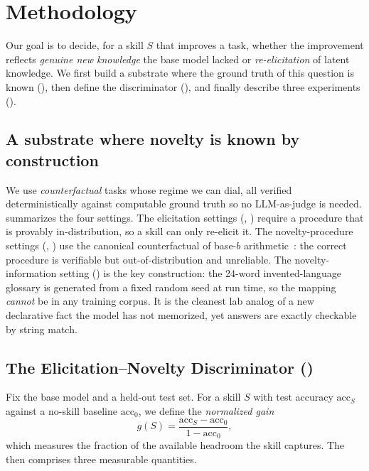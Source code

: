 \section{Methodology}
\label{sec:method}

Our goal is to decide, for a skill $S$ that improves a task, whether the improvement reflects
\emph{genuine new knowledge} the base model lacked or \emph{re-elicitation} of latent knowledge.
We first build a substrate where the ground truth of this question is known
(), then define the discriminator (), and finally
describe three experiments ().

\subsection{A substrate where novelty is known by construction}
\label{sec:substrate}

We use \emph{counterfactual} tasks whose regime we can dial, all verified deterministically
against computable ground truth so no LLM-as-judge is needed. 
summarizes the four settings. The elicitation settings (\arithbten, \vocabes) require a
procedure that is provably in-distribution, so a skill can only re-elicit it. The
novelty-procedure settings (\arithbnine, \arithbeleven) use the canonical counterfactual of
base-$b$ arithmetic~\citep{reasoningreciting}: the correct procedure is verifiable but
out-of-distribution and unreliable. The novelty-information setting (\vocabzeth) is the key
construction: the 24-word invented-language glossary is generated from a fixed random seed at
run time, so the mapping \emph{cannot} be in any training corpus. It is the cleanest lab analog
of a new declarative fact the model has not memorized, yet answers are exactly checkable by
string match.



\subsection{The Elicitation--Novelty Discriminator (\END)}
\label{sec:end}

Fix the base model and a held-out test set. For a skill $S$ with test accuracy $\mathrm{acc}_S$
against a no-skill baseline $\mathrm{acc}_0$, we define the \emph{normalized gain}
\begin{equation}
g(S) = \frac{\mathrm{acc}_S - \mathrm{acc}_0}{1 - \mathrm{acc}_0},
\label{eq:gain}
\end{equation}
which measures the fraction of the available headroom the skill captures. The \END then
comprises three measurable quantities.

